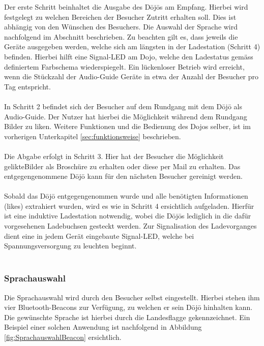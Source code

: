 Der erste Schritt beinhaltet die Ausgabe des Dōjōs am Empfang. Hierbei wird festgelegt zu welchen Bereichen der Besucher Zutritt erhalten soll. Dies ist abhängig von den Wünschen des Besuchers. Die Auswahl der Sprache wird nachfolgend im Abschnitt  beschrieben. Zu beachten gilt es, dass jeweils die Geräte ausgegeben werden, welche sich am längsten in der Ladestation (Schritt 4) befinden. Hierbei hilft eine Signal-LED am Dojo, welche den Ladestatus gemäss definiertem Farbschema wiederspiegelt. Ein lückenloser Betrieb wird erreicht, wenn die Stückzahl der Audio-Guide Geräte in etwa der Anzahl der Besucher pro Tag entspricht.
\\
\\
In Schritt 2 befindet sich der Besucher auf dem Rundgang mit dem Dōjō als Audio-Guide. Der Nutzer hat hierbei die Möglichkeit während dem Rundgang Bilder zu \glqq liken\grqq . Weitere Funktionen und die Bedienung des Dojos selber, ist im vorherigen Unterkapitel \ref{sec:funktionsweise} beschrieben.
\\
\\
Die Abgabe erfolgt in Schritt 3. Hier hat der Besucher die Möglichkeit \glqq gelikte\grqq Bilder als Broschüre zu erhalten oder diese per Mail zu erhalten. Das entgegengenommene Dōjō kann für den nächsten Besucher gereinigt werden.
\\
\\
Sobald das Dōjō entgegengenommen wurde und alle benötigten Informationen (\glqq likes\grqq) extrahiert wurden, wird es wie in Schritt 4 ersichtlich aufgeladen. Hierfür ist eine induktive Ladestation notwendig, wobei die Dōjōs lediglich in die dafür vorgesehenen Ladebuchsen gesteckt werden. Zur Signalisation des Ladevorganges dient eine in jedem Gerät eingebaute Signal-LED, welche bei Spannungsversorgung zu leuchten beginnt.
\\
\\
\subsubsection*{Sprachauswahl} \label{sec:sprachauswahl}

Die Sprachauswahl wird durch den Besucher selbst eingestellt. Hierbei stehen ihm vier Bluetooth-Beacons zur Verfügung, zu welchen er sein Dōjō hinhalten kann. Die gewünschte Sprache ist hierbei durch die Landesflagge gekennzeichnet. Ein Beispiel einer solchen Anwendung ist nachfolgend in Abbildung \ref{fig:SprachauswahlBeacon} ersichtlich.

